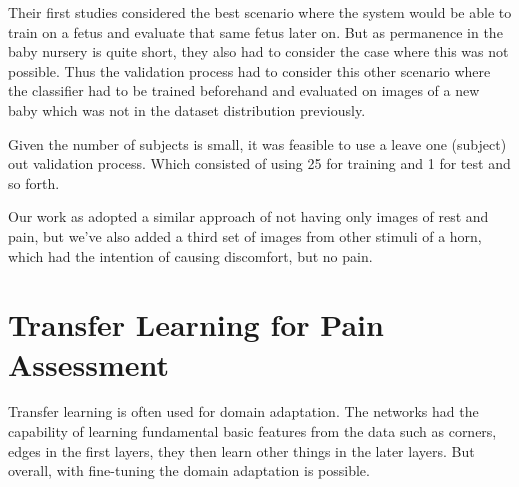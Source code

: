 
Their first studies considered the best scenario where the system would be able to train on a fetus and evaluate that same fetus later on. But as permanence in the baby nursery is quite short, they also had to consider the case where this was not possible. Thus the validation process had to consider this other scenario where the classifier had to be trained beforehand and evaluated on images of a new baby which was not in the dataset distribution previously.

Given the number of subjects is small, it was feasible to use a leave one (subject) out validation process. Which consisted of using 25 for training and 1 for test and so forth.

Our work as adopted a similar approach of not having only images of rest and pain, but we've also added a third set of images from other stimuli of a horn, which had the intention of causing discomfort, but no pain. 

\section{Transfer Learning for Pain Assessment}

Transfer learning is often used for domain adaptation. The networks had the capability of learning fundamental basic features from the data such as corners, edges in the first layers, they then learn other things in the later layers. But overall, with fine-tuning the domain adaptation is possible.